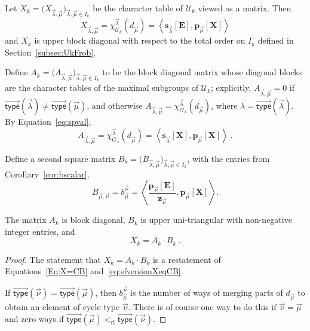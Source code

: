 \documentclass[ALCO,Unicode]{cedram}
\newcommand{\vtype}{\overrightarrow{\mathsf{type}}}
\newcommand{\XXX}{\mathbf{X}}
\newcommand{\EEE}{\mathbf{E}}
\begin{document}
\begin{prop} \label{prop:matrixX}
Let $X_k = \big( X_{ \vec{\lambda}, \vec{\mu}} \big)_{\vec{\lambda}, \vec{\mu}\in I_k}$
be the character table of $\mathcal{U}_k$ viewed as a matrix. Then
\[
X_{ \vec{\lambda}, \vec{\mu}} =
\chi^{\vec{\lambda}}_{\mathcal{U}_k}(d_{\vec{\mu}})
= \left< \mathbf{s}_{\vec{\lambda}}[\EEE], \mathbf{p}_{\vec{\mu}}[\XXX] \right>
\]
and $X_k$ is upper block diagonal with respect to the total order on $I_k$
defined in Section~\ref{subsec:UkFrob}.
\end{prop}

Define $A_k= \big( A_{ \vec{\lambda}, \vec{\mu}} \big)_{\vec{\lambda}, \vec{\mu}\in I_k}$
to be the block diagonal matrix whose diagonal blocks are the character
tables of the maximal subgroups of $\mathcal{U}_k$;
explicitly,
$A_{\vec{\lambda}, \vec{\mu}} = 0$ if $\vtype(\vec{\lambda}) \neq \vtype(\vec{\mu})$,
and otherwise
$A_{\vec{\lambda}, \vec{\mu}} = \chi^{\vec{\lambda}}_{G_\lambda}(d_{\vec{\mu}})$,
where $\lambda = \vtype(\vec{\lambda})$.
By Equation~\eqref{eq:spval},
\[
A_{\vec{\lambda}, \vec{\mu}} = \chi^{\vec{\lambda}}_{G_\lambda}( d_{\vec{\mu}} )
= \left< \mathbf{s}_{\vec{\lambda}}[\XXX], \mathbf{p}_{\vec{\mu}}[\XXX] \right>~.
\]

Define a second square matrix $B_k  = \big( B_{ \vec{\lambda}, \vec{\mu}} \big)_{\vec{\lambda}, \vec{\mu}\in I_k}$, with the entries from Corollary~\ref{cor:bscalar},
\[
B_{\vec{\mu},\vec{\nu}} = b_{\vec{\mu}}^{\vec{\nu}} =
\left< \frac{\mathbf{p}_{\vec{\nu}}[\EEE]}{\mathbf{z}_{\vec{\nu}}},
\mathbf{p}_{\vec{\mu}}[\XXX]\right>.
\]

\begin{prop}\label{prop:matrixAB}
The matrix $A_k$ is block diagonal,
$B_k$ is upper uni-triangular
with non-negative integer entries, and
\[
X_k = A_k \cdot B_k~.
\]
\end{prop}
\begin{proof}
The statement that
$X_k = A_k \cdot B_k$ is a restatement of Equations~\eqref{Eq:X=CB} and~\eqref{eq:sfversionXeqCB}.

If $\vtype(\vec{\nu}) = \vtype(\vec{\mu})$, then
$b_{\vec{\mu}}^{\vec{\nu}}$ is the number of ways
of merging parts of $d_{\vec{\mu}}$ to obtain an element
of cycle type $\vec{\nu}$.  There is of course one way to do this
if $\vec{\nu} = \vec{\mu}$ and zero ways
if $\vtype(\vec{\mu}) <_{\mathrm{rl}} \vtype(\vec{\nu})$.
\end{proof}
\end{document}

